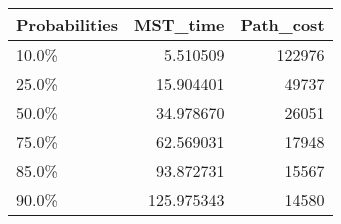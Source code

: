 \begin{tabular}{lrr}
\toprule
Probabilities &    MST\_time &  Path\_cost \\
\midrule
        10.0\% &    5.510509 &     122976 \\
        25.0\% &   15.904401 &      49737 \\
        50.0\% &   34.978670 &      26051 \\
        75.0\% &   62.569031 &      17948 \\
        85.0\% &   93.872731 &      15567 \\
        90.0\% &  125.975343 &      14580 \\
\bottomrule
\end{tabular}
